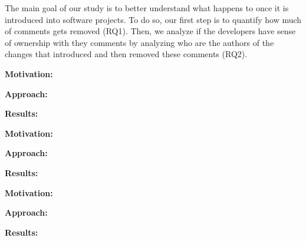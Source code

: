 The main goal of our study is to better understand what happens to \SATD once it is introduced into software projects. To do so, our first step is to quantify how much of \SATD comments gets removed (RQ1). Then, we analyze if the developers have sense of ownership with they \SATD comments by analyzing who are the authors of the changes that introduced and then removed these \SATD comments (RQ2). 

\vspace{3mm}
\noindent\rqi
\vspace{3mm}

\noindent \textbf{Motivation:} 

\vspace{1mm}
\noindent \textbf{Approach:} 

\vspace{1mm}
\noindent \textbf{Results:} 

\conclusionbox{}

\vspace{3mm}
\noindent\rqii
\vspace{3mm}

\noindent \textbf{Motivation:} 

\vspace{1mm}
\noindent \textbf{Approach:} 

\vspace{1mm}
\noindent \textbf{Results:} 

\conclusionbox{}

\vspace{3mm}
\noindent\rqiii
\vspace{3mm}

\noindent \textbf{Motivation:} 

\vspace{1mm}
\noindent \textbf{Approach:} 

\vspace{1mm}
\noindent \textbf{Results:} 

\conclusionbox{}





